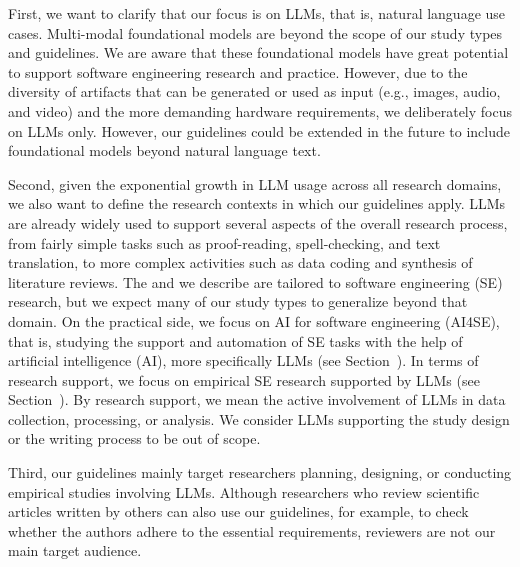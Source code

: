 First, we want to clarify that our focus is on LLMs, that is, natural language use cases.
Multi-modal foundational models are beyond the scope of our study types and guidelines.
We are aware that these foundational models have great potential to support software engineering research and practice.
However, due to the diversity of artifacts that can be generated or used as input (e.g., images, audio, and video) and the more demanding hardware requirements, we deliberately focus on LLMs only.
However, our guidelines could be extended in the future to include foundational models beyond natural language text.

Second, given the exponential growth in LLM usage across all research domains, we also want to define the research contexts in which our guidelines apply.
LLMs are already widely used to support several aspects of the overall research process, from fairly simple tasks such as proof-reading, spell-checking, and text translation, to more complex activities such as data coding and synthesis of literature reviews.
The \studytypes and \guidelines we describe are tailored to software engineering (SE) research, but we expect many of our study types to generalize beyond that domain.
On the practical side, we focus on AI for software engineering (AI4SE), that is, studying the support and automation of SE tasks with the help of artificial intelligence (AI), more specifically LLMs (see Section~\llmsforengineers).
In terms of research support, we focus on empirical SE research supported by LLMs (see Section~\llmsforresearcher).
By research support, we mean the active involvement of LLMs in data collection, processing, or analysis.
We consider LLMs supporting the study design or the writing process to be out of scope.

Third, our guidelines mainly target researchers planning, designing, or conducting empirical studies involving LLMs.
Although researchers who review scientific articles written by others can also use our guidelines, for example, to check whether the authors adhere to the essential \must requirements, reviewers are not our main target audience.
